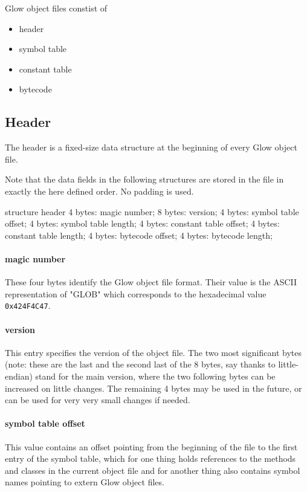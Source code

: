 \documentclass[12pt]{article}
\begin{document}
Glow object files constist of
\begin{itemize}
\item header
\item symbol table
\item constant table
\item bytecode
\end{itemize}

\subsection*{Header}
The header is a fixed-size data structure at the beginning of every Glow object file.

Note that the data fields in the following structures are stored in the file in
exactly the here defined order. No padding is used.

\begin{code}[language=C]
structure header {
    4 bytes: magic number;
    8 bytes: version;
    4 bytes: symbol table offset;
    4 bytes: symbol table length;
    4 bytes: constant table offset;
    4 bytes: constant table length;
    4 bytes: bytecode offset;
    4 bytes: bytecode length;
}
\end{code}

\paragraph{magic number}
    These four bytes identify the Glow object file format.
    Their value is the ASCII representation of "GLOB" which
    corresponds to the hexadecimal value \texttt{0x424F4C47}.

\paragraph{version}
    This entry specifies the version of the object file. The two most
    significant bytes (note: these are the last and the second last of the 8 bytes,
    say thanks to little-endian) stand for the main version, where the two following
    bytes can be increased on little changes. The remaining 4 bytes may be used in the
    future, or can be used for very very small changes if needed.

\paragraph{symbol table offset}
    This value contains an offset pointing from the beginning of the file to the first entry
    of the symbol table, which for one thing holds references to the methods and classes in the
    current object file and for another thing also contains symbol names pointing to
    extern Glow object files.
\end{document}
